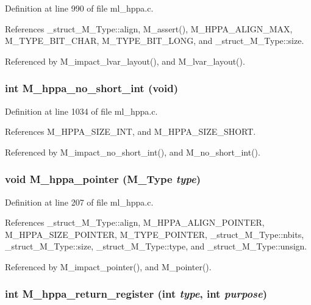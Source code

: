 Definition at line 990 of file ml\_\-hppa.c.

References \_\-struct\_\-M\_\-Type::align, M\_\-assert(), M\_\-HPPA\_\-ALIGN\_\-MAX, M\_\-TYPE\_\-BIT\_\-CHAR, M\_\-TYPE\_\-BIT\_\-LONG, and \_\-struct\_\-M\_\-Type::size.

Referenced by M\_\-impact\_\-lvar\_\-layout(), and M\_\-lvar\_\-layout().
\subsubsection{\setlength{\rightskip}{0pt plus 5cm}int M\_\-hppa\_\-no\_\-short\_\-int (void)}\label{ml__hppa_8c_dbed763f132cceeb65e656b6d8e496e7}




Definition at line 1034 of file ml\_\-hppa.c.

References M\_\-HPPA\_\-SIZE\_\-INT, and M\_\-HPPA\_\-SIZE\_\-SHORT.

Referenced by M\_\-impact\_\-no\_\-short\_\-int(), and M\_\-no\_\-short\_\-int().
\subsubsection{\setlength{\rightskip}{0pt plus 5cm}void M\_\-hppa\_\-pointer (\bf{M\_\-Type} {\em type})}\label{ml__hppa_8c_528caf4e3e210b61f1eae6ef859a6f77}




Definition at line 207 of file ml\_\-hppa.c.

References \_\-struct\_\-M\_\-Type::align, M\_\-HPPA\_\-ALIGN\_\-POINTER, M\_\-HPPA\_\-SIZE\_\-POINTER, M\_\-TYPE\_\-POINTER, \_\-struct\_\-M\_\-Type::nbits, \_\-struct\_\-M\_\-Type::size, \_\-struct\_\-M\_\-Type::type, and \_\-struct\_\-M\_\-Type::unsign.

Referenced by M\_\-impact\_\-pointer(), and M\_\-pointer().
\subsubsection{\setlength{\rightskip}{0pt plus 5cm}int M\_\-hppa\_\-return\_\-register (int {\em type}, int {\em purpose})}\label{ml__hppa_8c_fc6eeff2665dbbbff40338a13362c934}




